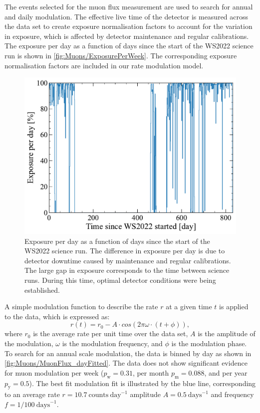 The events selected for the muon flux measurement are used to search for annual and daily modulation. The effective live time of the detector is measured across the data set to create exposure normalisation factors to account for the variation in exposure, which is affected by detector maintenance and regular calibrations. The exposure per day as a function of days since the start of the WS2022 science run is shown in \autoref{fig:Muons/ExposurePerWeek}. The corresponding exposure normalisation factors are included in our rate modulation model.
\begin{figure}[h!]
    \centering
    \includegraphics[width=0.8\linewidth]{figures/Muons/ExposurePerDay.pdf}
    \caption[Exposure per day as a function of days since the start of the WS2022 science run.]{Exposure per day as a function of days since the start of the WS2022 science run. The difference in exposure per day is due to detector downtime caused by maintenance and regular calibrations. The large gap in exposure corresponds to the time between science runs. During this time, optimal detector conditions were being established.}
    \label{fig:Muons/ExposurePerWeek}
\end{figure}
A simple modulation function to describe the rate $r$ at a given time $t$ is applied to the data, which is expressed as:
\begin{equation}\label{eqn:Muons/modulation}
    r(t)=r_0-A\cdot cos(2\pi\omega\cdot(t+\phi)),
\end{equation}
where $r_0$ is the average rate per unit time over the data set, $A$ is the amplitude of the modulation, $\omega$ is the modulation frequency, and $\phi$ is the modulation phase. To search for an annual scale modulation, the data is binned by day as shown in \autoref{fig:Muons/MuonFlux_dayFitted}. The data does not show significant evidence for muon modulation per week ($p_\text{w}=0.31$, per month $p_\text{m}=0.088$, and per year $p_\text{y}=0.5$). The best fit modulation fit is illustrated by the blue line, corresponding to an average rate $r=10.7~\text{counts}~\text{day}^{-1}$ amplitude $A=0.5~\text{days}^{-1}$ and frequency $f=1/100~\text{days}^{-1}$.
